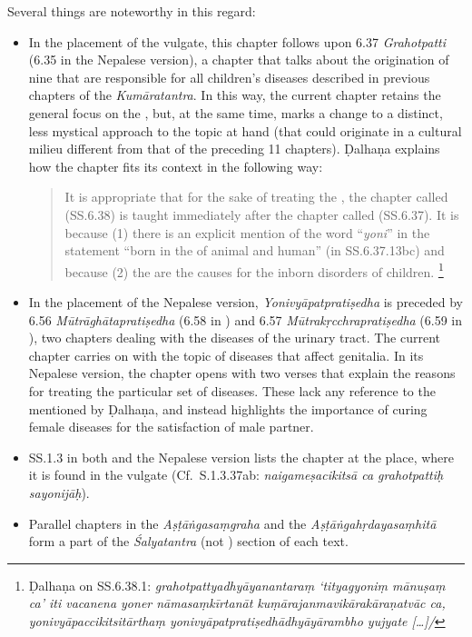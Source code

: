 Several things are noteworthy in this regard:
\begin{itemize}
	\item In the placement of the vulgate, this chapter follows upon 6.37 \textit{Grahotpatti} (6.35 in the Nepalese version), a chapter that talks about the origination of nine  that are responsible for all children's diseases described in previous chapters of the \textit{Kumāratantra}. In this way, the current chapter retains the general focus on the , but, at the same time, marks a change to a distinct, less mystical approach to the topic at hand (that could originate in a cultural milieu different from that of the preceding 11 chapters). Ḍalhaṇa  \parencite[668b]{vulgate} explains how the chapter fits its context in the following way: 
		\begin{quote}
		It is appropriate that for the sake of treating the , the chapter called  (SS.6.38) is taught immediately after the chapter called  (SS.6.37). It is because (1) there is an explicit mention of the word “\textit{yoni}” in the statement  “born in the  of animal and human” (in SS.6.37.13bc) and because (2) the  are the causes for the inborn disorders of children.%
			\footnote{%
			Ḍalhaṇa on SS.6.38.1: \textit{grahotpattyadhyāyanantaraṃ ‘tityagyoniṃ mānuṣaṃ ca’ iti vacanena yoner nāmasaṃkīrtanāt kuṃārajanmavikārakāraṇatvāc ca, yonivyāpaccikitsitārthaṃ yonivyāpatpratiṣedhādhyāyārambho yujyate [\ldots]/}%
			}
		\end{quote}

	\item In the placement of the Nepalese version, \textit{Yonivyāpatpratiṣedha} is preceded by 6.56 \textit{Mūtrāghātapratiṣedha} (6.58 in \cite{vulgate}) and 6.57 \textit{Mūtrakṛcchrapratiṣedha} (6.59 in \cite{vulgate}), two chapters dealing with the diseases of the urinary tract. The current chapter carries on with the topic of diseases that affect genitalia. In its Nepalese version, the chapter opens with two verses that explain the reasons for treating the particular set of diseases. These lack any reference to the  mentioned by Ḍalhaṇa, and instead highlights the importance of curing female diseases for the satisfaction of male partner. 
	\item SS.1.3 in both \cite{vulgate} and the Nepalese version lists the chapter at the place, where it is found in the vulgate (Cf.\ S.1.3.37ab: \textit{naigameṣacikitsā ca grahotpattiḥ sayonijāḥ}).
	\item Parallel chapters in the \textit{Aṣṭāṅgasaṃgraha} and the \textit{Aṣṭāṅgahṛdayasaṃhitā} form a part of the \textit{Śalyatantra} (not ) section of each text.
\end{itemize} 
